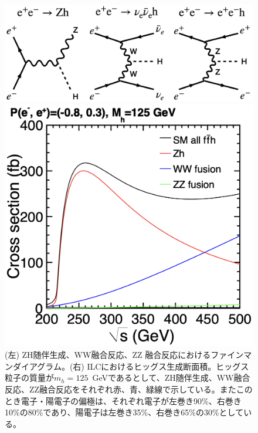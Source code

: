 \begin{figure}[H]
 \begin{minipage}[h]{.45\linewidth}
 \includegraphics[keepaspectratio, scale=0.18]
 	{Figure/Introduction/higgs_cs_feynman.png}
\end{minipage}
\hfill
 \begin{minipage}[h]{.45\linewidth}
 \includegraphics[keepaspectratio, scale=0.25]
 	{Figure/Introduction/higgs_cross_section.png}
\end{minipage}
\label{higgs_cs}
\caption{(左) ZH随伴生成、WW融合反応、ZZ 融合反応におけるファインマンダイアグラム。(右) ILCにおけるヒッグス生成断面積。ヒッグス粒子の質量が$m_h=125$\ GeVであるとして、ZH随伴生成、WW融合反応、ZZ融合反応をそれぞれ赤、青、緑線で示している。またこのとき電子・陽電子の偏極は、それぞれ電子が左巻き90\%、右巻き10\%の80\%であり、陽電子は左巻き35\%、右巻き65\%の30\%としている。}
\end{figure}
